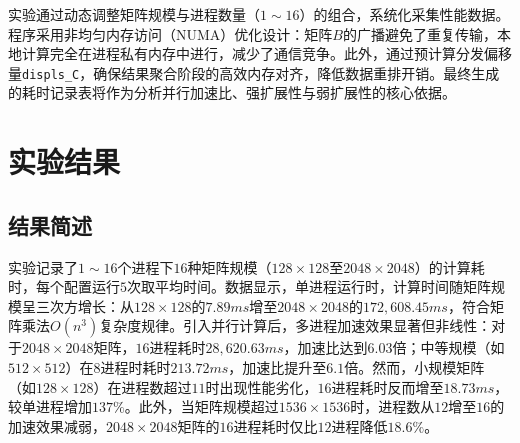 \documentclass[a4paper, utf8]{ctexart}
\begin{document}
	实验通过动态调整矩阵规模与进程数量（$1\sim16$）的组合，系统化采集性能数据。程序采用非均匀内存访问（NUMA）优化设计：矩阵$B$的广播避免了重复传输，本地计算完全在进程私有内存中进行，减少了通信竞争。此外，通过预计算分发偏移量\verb|displs_C|，确保结果聚合阶段的高效内存对齐，降低数据重排开销。最终生成的耗时记录表将作为分析并行加速比、强扩展性与弱扩展性的核心依据。
	
	\section{实验结果}
	
	\subsection{结果简述}
	
	实验记录了$1\sim16$个进程下$16$种矩阵规模（$128\times128$至$2048\times2048$）的计算耗时，每个配置运行$5$次取平均时间。数据显示，单进程运行时，计算时间随矩阵规模呈三次方增长：从$128\times128$的$7.89ms$增至$2048\times2048$的$172,608.45ms$，符合矩阵乘法$O(n^3)$复杂度规律。引入并行计算后，多进程加速效果显著但非线性：对于$2048\times2048$矩阵，$16$进程耗时$28,620.63ms$，加速比达到$6.03$倍；中等规模（如$512\times512$）在$8$进程时耗时$213.72ms$，加速比提升至$6.1$倍。然而，小规模矩阵（如$128\times128$）在进程数超过$11$时出现性能劣化，$16$进程耗时反而增至$18.73ms$，较单进程增加$137\%$。此外，当矩阵规模超过$1536\times1536$时，进程数从$12$增至$16$的加速效果减弱，$2048\times2048$矩阵的$16$进程耗时仅比$12$进程降低$18.6\%$。
	
\end{document}
